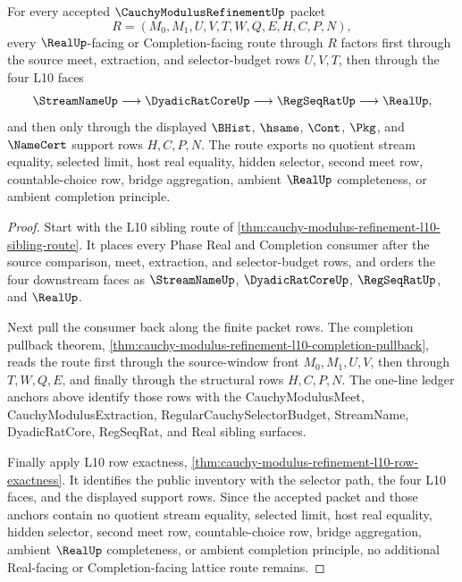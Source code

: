 \begin{theorem}
\label{thm:cauchy-modulus-refinement-l10-window-lattice-exactness}
For every accepted $\CauchyModulusRefinementUp$ packet
$$
R=(M_0,M_1,U,V,T,W,Q,E,H,C,P,N),
$$
every $\RealUp$-facing or Completion-facing route through $R$ factors first through the source meet, extraction, and selector-budget rows $U,V,T$, then through the four L10 faces
$$
\StreamNameUp \longrightarrow \DyadicRatCoreUp \longrightarrow \RegSeqRatUp \longrightarrow \RealUp,
$$
and then only through the displayed $\BHist$, $\hsame$, $\Cont$, $\Pkg$, and $\NameCert$ support rows $H,C,P,N$. The route exports no quotient stream equality, selected limit, host real equality, hidden selector, second meet row, countable-choice row, bridge aggregation, ambient $\RealUp$ completeness, or ambient completion principle.
\end{theorem}
\begin{proof}
Start with the L10 sibling route of \autoref{thm:cauchy-modulus-refinement-l10-sibling-route}. It places every Phase Real and Completion consumer after the source comparison, meet, extraction, and selector-budget rows, and orders the four downstream faces as $\StreamNameUp$, $\DyadicRatCoreUp$, $\RegSeqRatUp$, and $\RealUp$.

Next pull the consumer back along the finite packet rows. The completion pullback theorem, \autoref{thm:cauchy-modulus-refinement-l10-completion-pullback}, reads the route first through the source-window front $M_0,M_1,U,V$, then through $T,W,Q,E$, and finally through the structural rows $H,C,P,N$. The one-line ledger anchors above identify those rows with the CauchyModulusMeet, CauchyModulusExtraction, RegularCauchySelectorBudget, StreamName, DyadicRatCore, RegSeqRat, and Real sibling surfaces.

Finally apply L10 row exactness, \autoref{thm:cauchy-modulus-refinement-l10-row-exactness}. It identifies the public inventory with the selector path, the four L10 faces, and the displayed support rows. Since the accepted packet and those anchors contain no quotient stream equality, selected limit, host real equality, hidden selector, second meet row, countable-choice row, bridge aggregation, ambient $\RealUp$ completeness, or ambient completion principle, no additional Real-facing or Completion-facing lattice route remains.
\end{proof}

